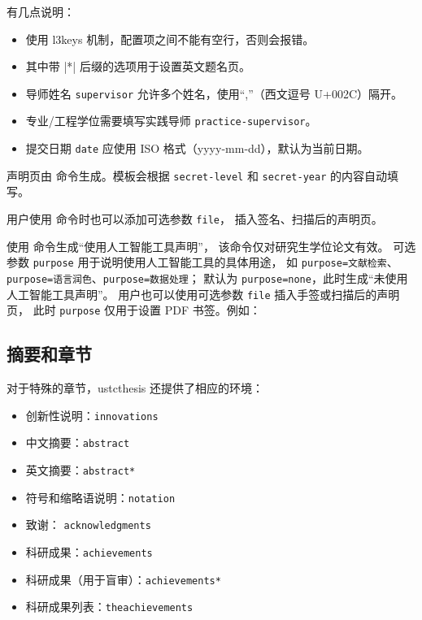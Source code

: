 \documentclass[a4paper]{ltxdoc}
\DeclareRobustCommand\env{\texttt}
\DeclareRobustCommand\pkg{\textsf}
\DeclareRobustCommand\cls{\textsf}
\DeclareRobustCommand\opt{\texttt}
\begin{document}
有几点说明：
\begin{itemize}
  \item {} 使用 \pkg{l3keys} 机制，配置项之间不能有空行，否则会报错。
  \item 其中带 |*| 后缀的选项用于设置英文题名页。
  \item 导师姓名 \opt{supervisor} 允许多个姓名，使用“,”（西文逗号 U+002C）隔开。
  \item 专业/工程学位需要填写实践导师 \opt{practice-supervisor}。
  \item 提交日期 \opt{date} 应使用 ISO 格式（yyyy-mm-dd），默认为当前日期。
\end{itemize}

\DescribeMacro{\declarationoforiginality}
声明页由  命令生成。模板会根据 \opt{secret-level} 和
\opt{secret-year} 的内容自动填写。

用户使用  命令时也可以添加可选参数 \opt{file}，
插入签名、扫描后的声明页。
\begin{latex}
  \declarationoforiginality[file=figures/scan-statement.pdf]
\end{latex}

\DescribeMacro{\declarationofaiusage}
使用  命令生成“使用人工智能工具声明”，
该命令仅对研究生学位论文有效。
可选参数 \opt{purpose} 用于说明使用人工智能工具的具体用途，
如 \opt{purpose=文献检索}、\opt{purpose=语言润色}、\opt{purpose=数据处理}；
默认为 \opt{purpose=none}，此时生成“未使用人工智能工具声明”。
用户也可以使用可选参数 \opt{file} 插入手签或扫描后的声明页，
此时 \opt{purpose} 仅用于设置 PDF 书签。例如：
\begin{latex}
  \declarationofaiusage[purpose=语言润色]
\end{latex}

\subsection{摘要和章节}
对于特殊的章节，\cls{ustcthesis} 还提供了相应的环境：
\begin{itemize}
  \item 创新性说明：\env{innovations}
  \item 中文摘要：\env{abstract}
  \item 英文摘要：\env{abstract*}
  \item 符号和缩略语说明：\env{notation}
  \item 致谢：    \env{acknowledgments}
  \item 科研成果：\env{achievements}
  \item 科研成果（用于盲审）：\env{achievements*}
  \item 科研成果列表：\env{theachievements}
\end{itemize}
\end{document}
